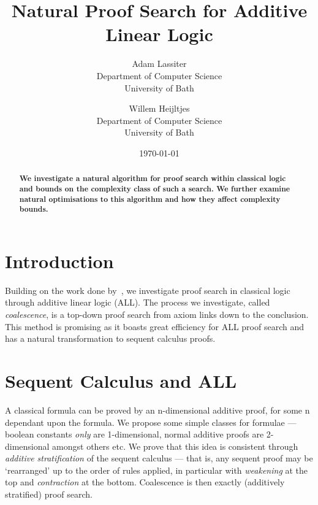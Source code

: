 

\title{Natural Proof Search for Additive Linear Logic}
\author{Adam Lassiter\\Department of Computer Science\\University of Bath \and Willem Heijltjes\\Department of Computer Science\\University of Bath}
\date{\today}



    \maketitle
    \begin{abstract}
        \textbf{
            We investigate a natural algorithm for proof search within classical logic and bounds on the complexity class of such a search.
            We further examine natural optimisations to this algorithm and how they affect complexity bounds.
        }
    \end{abstract}

    \section*{Introduction}
        Building on the work done by~\cite{petri-nets}, we investigate proof search in classical logic through additive linear logic (ALL).
        The process we investigate, called \textit{coalescence}, is a top-down proof search from axiom links down to the conclusion.
        This method is promising as it boasts great efficiency for ALL proof search and has a natural transformation to sequent calculus proofs.

    \section*{Sequent Calculus and ALL}
        A classical formula can be proved by an n-dimensional additive proof, for some n dependant upon the formula.
        We propose some simple classes for formulae --- boolean constants \textit{only} are 1-dimensional, normal additive proofs are 2-dimensional amongst others etc.
        We prove that this idea is consistent through \textit{additive stratification} of the sequent calculus --- that is, any sequent proof may be `rearranged' up to the order of rules applied, in particular with \textit{weakening} at the top and \textit{contraction} at the bottom.
        Coalescence is then exactly (additively stratified) proof search.

